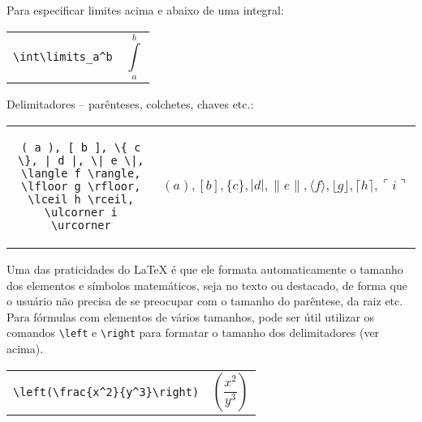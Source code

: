 \bigskip

Para especificar limites acima e abaixo de uma integral:



\begin{tabular}{cc}
\begin{minipage}{0.4\textwidth}
\verb+\int\limits_a^b+
\end{minipage} & \begin{minipage}{0.4\textwidth}\[ \int\limits_a^b \] \end{minipage}
\end{tabular}


Delimitadores -- parênteses, colchetes, chaves etc.:


\begin{tabular}{cc}
\begin{minipage}{0.4\textwidth}
\begin{verbatim}
( a ), [ b ], \{ c \}, | d |, \| e \|,
\langle f \rangle, \lfloor g \rfloor,
\lceil h \rceil, \ulcorner i \urcorner
\end{verbatim}
\end{minipage} & 
\begin{minipage}{0.4\textwidth}
\begin{displaymath}
( a ), [ b ], \{ c \}, | d |, \| e \|,
\langle f \rangle, \lfloor g \rfloor,
\lceil h \rceil, \ulcorner i \urcorner
\end{displaymath}
 \end{minipage}
\end{tabular}

\bigskip


Uma das praticidades do \LaTeX{} é que ele formata automaticamente o tamanho dos elementos e símbolos matemáticos, seja no texto ou destacado, de forma que o usuário não precisa de se preocupar com o tamanho do parêntese, da raiz etc. Para fórmulas com elementos de vários tamanhos, pode ser útil utilizar os comandos \verb+\left+ e \verb+\right+ para formatar o tamanho dos delimitadores (ver acima). 


\begin{tabular}{cc}
\begin{minipage}{0.4\textwidth}
\begin{verbatim}
\left(\frac{x^2}{y^3}\right)
\end{verbatim}
\end{minipage}
&
\begin{minipage}{0.4\textwidth}
\begin{displaymath}
\left(\frac{x^2}{y^3}\right)
\end{displaymath}
\end{minipage}
\end{tabular}

